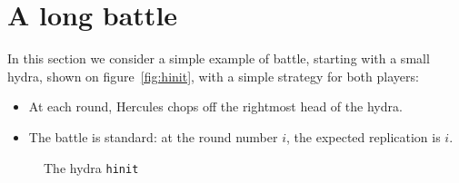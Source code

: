 

 




\section{A long battle}
\label{sect:big-battle}


In this section we consider a simple example of battle, starting with a small hydra,
shown on figure~\vref{fig:hinit}, with a simple strategy for both players:

\begin{itemize}
\item At each round, Hercules chops off the rightmost head of the hydra.
\item The battle is {standard}: at the round number $i$, the expected replication is $i$.
\end{itemize}



\begin{figure}[h]
  \centering

  \caption{The hydra \texttt{hinit}}
  \label{fig:hinit}
\end{figure}

